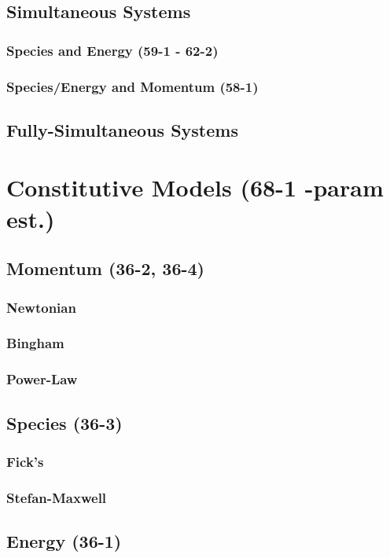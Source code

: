 \documentclass{mitqualif}
\begin{document}
\subsection{Simultaneous Systems}
\subsubsection{Species and Energy (59-1 - 62-2)}
\subsubsection{Species/Energy and Momentum (58-1)}
\subsection{Fully-Simultaneous Systems}
\section{Constitutive Models (68-1 -param est.)}
\subsection{Momentum (36-2, 36-4)}
\subsubsection{Newtonian}
\subsubsection{Bingham}
\subsubsection{Power-Law}
\subsection{Species (36-3)}
\subsubsection{Fick's}
\subsubsection{Stefan-Maxwell}
\subsection{Energy (36-1)}
 
\end{document}
